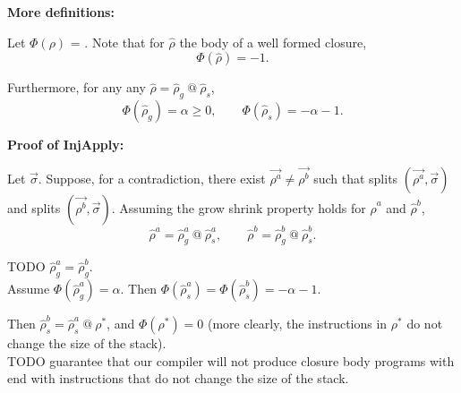 \documentclass[11pt]{article}
\begin{document}
\textbf{More definitions:}

Let $\Phi(\rho)$ = . Note that for $\hat{\rho}$ the body of a well formed closure, $$\Phi(\hat{\rho}) = -1.$$

Furthermore, for any  any $\hat{\rho} = \hat{\rho}_g\ @\ \hat{\rho}_s$, $$\Phi(\hat{\rho}_g) = \alpha \ge 0, \qquad \Phi(\hat{\rho}_s) = - \alpha - 1.$$

\textbf{Proof of InjApply:}

Let $\vec{\sigma}$. Suppose, for a contradiction, there exist $\vec{\rho^a} \neq \vec{\rho^b}$ such that splits $(\vec{\rho^a}, \vec{\sigma})$ and splits $(\vec{\rho^b}, \vec{\sigma})$. Assuming the grow shrink property holds for $\hat{\rho}^a$ and $\hat{\rho}^b$, $$\hat{\rho}^a = \hat{\rho}_g^a\ @\ \hat{\rho}_s^a, \qquad \hat{\rho}^b = \hat{\rho}_g^b\ @\ \hat{\rho}_s^b.$$

TODO $\hat{\rho}_g^a = \hat{\rho}_g^b$.\\

Assume $\Phi(\hat{\rho}_g^a) = \alpha$. Then $\Phi(\hat{\rho}_s^a) = \Phi(\hat{\rho}_s^b) = - \alpha - 1$.

Then $\hat{\rho}_s^b = \hat{\rho}_s^a\ @\ \rho^*$, and $\Phi(\rho^*) = 0$ (more clearly, the instructions in $\rho^*$ do not change the size of the stack). \\

TODO guarantee that our compiler will not produce closure body programs with end with instructions that do not change the size of the stack.
\end{document}
